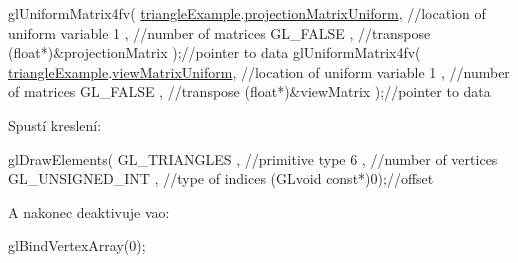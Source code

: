 \begin{DoxyCodeInclude}
  glUniformMatrix4fv(
      \hyperlink{triangleExample_8c_af82b723635ac0c90962571915a1b1163}{triangleExample}.\hyperlink{structTriangleExampleVariables_a0215b92b36815394d6a4c8b5e3baa27a}{projectionMatrixUniform}, \textcolor{comment}{//location of uniform
       variable}
      1                                      , \textcolor{comment}{//number of matrices}
      GL\_FALSE                               , \textcolor{comment}{//transpose}
      (\textcolor{keywordtype}{float}*)&projectionMatrix              );\textcolor{comment}{//pointer to data}
  glUniformMatrix4fv(
      \hyperlink{triangleExample_8c_af82b723635ac0c90962571915a1b1163}{triangleExample}.\hyperlink{structTriangleExampleVariables_a94cf55d21d35fb4d0f85c1d7a49e6474}{viewMatrixUniform}, \textcolor{comment}{//location of uniform variable}
      1                                , \textcolor{comment}{//number of matrices}
      GL\_FALSE                         , \textcolor{comment}{//transpose}
      (\textcolor{keywordtype}{float}*)&viewMatrix              );\textcolor{comment}{//pointer to data}
\end{DoxyCodeInclude}
Spustí kreslení\-: 
\begin{DoxyCodeInclude}
  glDrawElements(
      GL\_TRIANGLES    , \textcolor{comment}{//primitive type}
      6               , \textcolor{comment}{//number of vertices}
      GL\_UNSIGNED\_INT , \textcolor{comment}{//type of indices}
      (GLvoid \textcolor{keyword}{const}*)0);\textcolor{comment}{//offset}
\end{DoxyCodeInclude}
A nakonec deaktivuje vao\-: 
\begin{DoxyCodeInclude}
  glBindVertexArray(0);
\end{DoxyCodeInclude}
 
\begin{DoxyCodeInclude}
\end{DoxyCodeInclude}
 